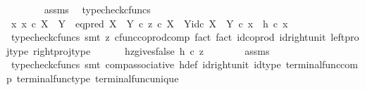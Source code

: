\begin{isabellebody}
\ \ \ \ \ \ \isamarkupfalse%
\ assms\ \isamarkupfalse%
\ typecheck{\isacharunderscore}{\kern0pt}cfuncs\isanewline
\ \ \ \ \isamarkupfalse%
\ \isamarkupfalse%
\ {\isachardoublequoteopen}{\isasymAnd}x{\isachardot}{\kern0pt}\ x\ {\isasymin}\isactrlsub c\ X\ {\isasymCoprod}\ Y\ {\isasymLongrightarrow}\ {\isacharparenleft}{\kern0pt}eq{\isacharunderscore}{\kern0pt}pred\ {\isacharparenleft}{\kern0pt}X\ {\isasymCoprod}\ Y{\isacharparenright}{\kern0pt}\ {\isasymcirc}\isactrlsub c\ {\isasymlangle}z\ {\isasymcirc}\isactrlsub c\ {\isasymbeta}\isactrlbsub X\ {\isasymCoprod}\ Y\isactrlesub {\isacharcomma}{\kern0pt}id\isactrlsub c\ {\isacharparenleft}{\kern0pt}X\ {\isasymCoprod}\ Y{\isacharparenright}{\kern0pt}{\isasymrangle}{\isacharparenright}{\kern0pt}\ {\isasymcirc}\isactrlsub c\ x\ {\isacharequal}{\kern0pt}\ h\ {\isasymcirc}\isactrlsub c\ x{\isachardoublequoteclose}\isanewline
\ \ \ \ \ \ \isamarkupfalse%
\ {\isacharparenleft}{\kern0pt}typecheck{\isacharunderscore}{\kern0pt}cfuncs{\isacharcomma}{\kern0pt}\ smt\ {\isacharparenleft}{\kern0pt}z{}{\isacharparenright}{\kern0pt}\ cfunc{\isacharunderscore}{\kern0pt}coprod{\isacharunderscore}{\kern0pt}comp\ fact{}\ fact{}\ id{\isacharunderscore}{\kern0pt}coprod\ id{\isacharunderscore}{\kern0pt}right{\isacharunderscore}{\kern0pt}unit{}\ left{\isacharunderscore}{\kern0pt}proj{\isacharunderscore}{\kern0pt}type\ right{\isacharunderscore}{\kern0pt}proj{\isacharunderscore}{\kern0pt}type{\isacharparenright}{\kern0pt}\isanewline
\ \ \isamarkupfalse%
\isanewline
\isanewline
\ \ \isamarkupfalse%
\ hz{\isacharunderscore}{\kern0pt}gives{\isacharunderscore}{\kern0pt}false{\isacharcolon}{\kern0pt}\ {\isachardoublequoteopen}h\ {\isasymcirc}\isactrlsub c\ z\ {\isacharequal}{\kern0pt}\ {\isasymf}{\isachardoublequoteclose}\isanewline
\ \ \ \ \isamarkupfalse%
\ assms\ \isamarkupfalse%
\ {\isacharparenleft}{\kern0pt}typecheck{\isacharunderscore}{\kern0pt}cfuncs{\isacharcomma}{\kern0pt}\ smt\ comp{\isacharunderscore}{\kern0pt}associative{}\ h{\isacharunderscore}{\kern0pt}def\ id{\isacharunderscore}{\kern0pt}right{\isacharunderscore}{\kern0pt}unit{}\ id{\isacharunderscore}{\kern0pt}type\ terminal{\isacharunderscore}{\kern0pt}func{\isacharunderscore}{\kern0pt}comp\ terminal{\isacharunderscore}{\kern0pt}func{\isacharunderscore}{\kern0pt}type\ terminal{\isacharunderscore}{\kern0pt}func{\isacharunderscore}{\kern0pt}unique{\isacharparenright}{\kern0pt}\isanewline

\end{isabellebody}
